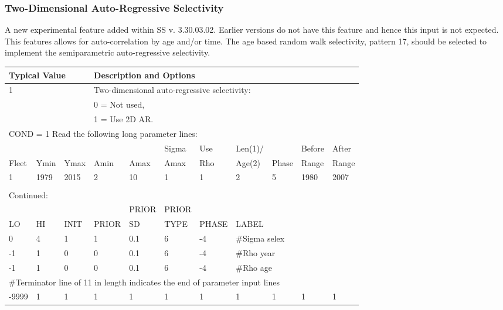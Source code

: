 \subsubsection{Two-Dimensional Auto-Regressive Selectivity}
A new experimental feature added within SS v. 3.30.03.02.  Earlier versions do not have this feature and hence this input is not expected.  This features allows for auto-correlation by age and/or time.  The age based random walk selectivity, pattern 17, should be selected to implement the semiparametric auto-regressive selectivity. 


\begin{longtable}{p{1cm} p{1cm} p{1cm} p{1.25cm} p{1.25cm} p{1.25cm} p{1.2cm} p{1.2cm} p{1cm} p{1cm} p{1cm}}
		
	\multicolumn{3}{l}{Typical Value} &  \multicolumn{8}{l}{Description and Options} \\
	\hline

	\multicolumn{3}{l}{1} & \multicolumn{8}{l}{Two-dimensional auto-regressive selectivity:}\Tstrut\\
	\multicolumn{3}{l}{ } & \multicolumn{8}{l}{0 = Not used,}\\
	\multicolumn{3}{l}{ } & \multicolumn{8}{l}{1 = Use 2D AR.}\Tstrut\\

	\multicolumn{11}{l}{COND = 1 Read the following long parameter lines:}\\
	\hline
	\Tstrut &    &      &      &      & Sigma & Use & Len(1)/ &       & Before & After\\
	Fleet & Ymin & Ymax & Amin & Amax & Amax  & Rho & Age(2)  & Phase & Range  & Range\Bstrut\\
	\hline
	   1    & 1979 & 2015 &  2   &  10  & 1     & 1   & 2       & 5     & 1980   & 2007\Tstrut\Bstrut\\
	\hline
	\\
	
	\multicolumn{11}{l}{Continued:} \\
	\hline
	     &    &      &       & PRIOR & PRIOR &       &     & & & \Tstrut\\
	LO & HI & INIT & PRIOR & SD    & TYPE  & PHASE & \multicolumn{4}{l}{LABEL}\Bstrut\\
	\hline
	 0 & 4 & 1 & 1 & 0.1 & 6 & -4 & \multicolumn{4}{l}{\#Sigma selex}\Tstrut\\
	-1 & 1 & 0 & 0 & 0.1 & 6 & -4 & \multicolumn{4}{l}{\#Rho year}\\
	-1 & 1 & 0 & 0 & 0.1 & 6 & -4 & \multicolumn{4}{l}{\#Rho age}\Bstrut\\
	\multicolumn{11}{l}{\#Terminator line of 11 in length indicates the end of parameter input lines}\\
	-9999 & 1 & 1 & 1 & 1 & 1 & 1 & 1 & 1 & 1 & 1 \\
	\hline
\end{longtable}


